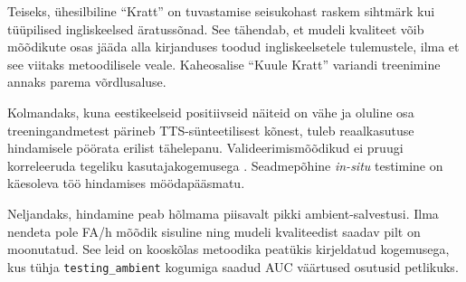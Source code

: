 Teiseks, ühesilbiline \enquote{Kratt} on tuvastamise seisukohast raskem sihtmärk kui tüüpilised ingliskeelsed äratussõnad. See tähendab, et mudeli kvaliteet võib mõõdikute osas jääda alla kirjanduses toodud ingliskeelsetele tulemustele, ilma et see viitaks metoodilisele veale. Kaheosalise \enquote{Kuule Kratt} variandi treenimine annaks parema võrdlusaluse.

Kolmandaks, kuna eestikeelseid positiivseid näiteid on vähe ja oluline osa treeningandmetest pärineb TTS-sünteetilisest kõnest, tuleb reaalkasutuse hindamisele pöörata erilist tähelepanu. Valideerimismõõdikud ei pruugi korreleeruda tegeliku kasutajakogemusega \cite{microwakeword2026}. Seadmepõhine \emph{in-situ} testimine on käesoleva töö hindamises möödapääsmatu.

Neljandaks, hindamine peab hõlmama piisavalt pikki ambient-salvestusi. Ilma nendeta pole FA/h mõõdik sisuline ning mudeli kvaliteedist saadav pilt on moonutatud. See leid on kooskõlas metoodika peatükis kirjeldatud kogemusega, kus tühja \texttt{testing\_ambient} kogumiga saadud AUC väärtused osutusid petlikuks.
